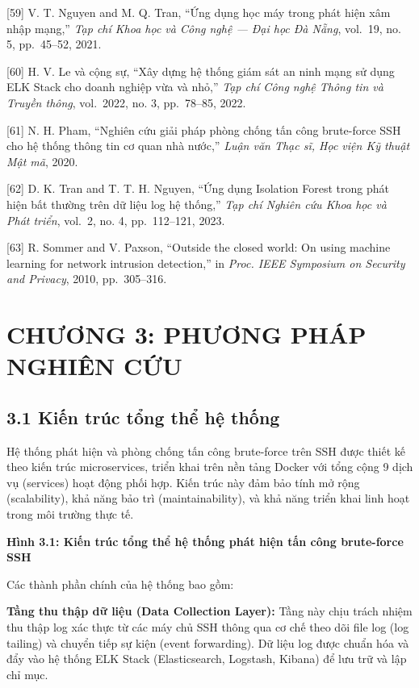 \documentclass[
  a4paper]{report}
\begin{document}
{[}59{]} V. T. Nguyen and M. Q. Tran, ``Ứng dụng học máy trong phát hiện
xâm nhập mạng,'' \emph{Tạp chí Khoa học và Công nghệ --- Đại học Đà
Nẵng}, vol.~19, no. 5, pp.~45--52, 2021.

{[}60{]} H. V. Le và cộng sự, ``Xây dựng hệ thống giám sát an ninh mạng
sử dụng ELK Stack cho doanh nghiệp vừa và nhỏ,'' \emph{Tạp chí Công nghệ
Thông tin và Truyền thông}, vol.~2022, no. 3, pp.~78--85, 2022.

{[}61{]} N. H. Pham, ``Nghiên cứu giải pháp phòng chống tấn công
brute-force SSH cho hệ thống thông tin cơ quan nhà nước,'' \emph{Luận
văn Thạc sĩ, Học viện Kỹ thuật Mật mã}, 2020.

{[}62{]} D. K. Tran and T. T. H. Nguyen, ``Ứng dụng Isolation Forest
trong phát hiện bất thường trên dữ liệu log hệ thống,'' \emph{Tạp chí
Nghiên cứu Khoa học và Phát triển}, vol.~2, no. 4, pp.~112--121, 2023.

{[}63{]} R. Sommer and V. Paxson, ``Outside the closed world: On using
machine learning for network intrusion detection,'' in \emph{Proc. IEEE
Symposium on Security and Privacy}, 2010, pp.~305--316.

\chapter{CHƯƠNG 3: PHƯƠNG PHÁP NGHIÊN
CỨU}\label{chux1b0ux1a1ng-3-phux1b0ux1a1ng-phuxe1p-nghiuxean-cux1ee9u}

\section{3.1 Kiến trúc tổng thể hệ
thống}\label{kiux1ebfn-truxfac-tux1ed5ng-thux1ec3-hux1ec7-thux1ed1ng}

Hệ thống phát hiện và phòng chống tấn công brute-force trên SSH được
thiết kế theo kiến trúc microservices, triển khai trên nền tảng Docker
với tổng cộng 9 dịch vụ (services) hoạt động phối hợp. Kiến trúc này đảm
bảo tính mở rộng (scalability), khả năng bảo trì (maintainability), và
khả năng triển khai linh hoạt trong môi trường thực tế.

\textbf{Hình 3.1: Kiến trúc tổng thể hệ thống phát hiện tấn công
brute-force SSH}

Các thành phần chính của hệ thống bao gồm:

\textbf{Tầng thu thập dữ liệu (Data Collection Layer):} Tầng này chịu
trách nhiệm thu thập log xác thực từ các máy chủ SSH thông qua cơ chế
theo dõi file log (log tailing) và chuyển tiếp sự kiện (event
forwarding). Dữ liệu log được chuẩn hóa và đẩy vào hệ thống ELK Stack
(Elasticsearch, Logstash, Kibana) để lưu trữ và lập chỉ mục.
\end{document}
